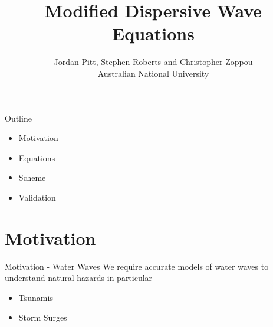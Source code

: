 \documentclass[pdf]{beamer}
\title{Modified Dispersive Wave Equations}
\author{Jordan Pitt, Stephen Roberts and Christopher Zoppou \\ Australian National University}
\begin{document}
	
\begin{frame}[plain]{}
\end{frame}

\begin{frame}
	\titlepage
\end{frame}


\begin{frame}{Outline}
	\begin{itemize}
		\item Motivation
		\item Equations
		\item Scheme
		\item Validation
	\end{itemize}
\end{frame}
\section{Motivation}
\begin{frame}{Motivation - Water Waves}
We require accurate models of water waves to understand natural hazards in particular
	\begin{itemize}
		\item Tsunamis
		\item Storm Surges
	\end{itemize}
\end{frame}
\end{document}
